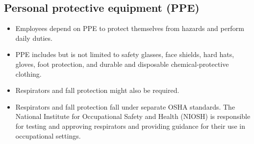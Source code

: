 \subsection{Personal protective equipment (PPE)}
\begin{itemize}
\item Employees depend on PPE to protect themselves from hazards and perform daily duties. 
\item PPE includes but is not limited to safety glasses, face shields, hard hats, gloves, foot protection, and durable and disposable chemical-protective clothing. 
\item Respirators and fall protection might also be required.
\item Respirators and fall protection fall under separate OSHA  standards. The National Institute for Occupational Safety and Health (NIOSH) is responsible for testing and approving respirators and providing guidance for their use in occupational settings.\\
\end{itemize}
